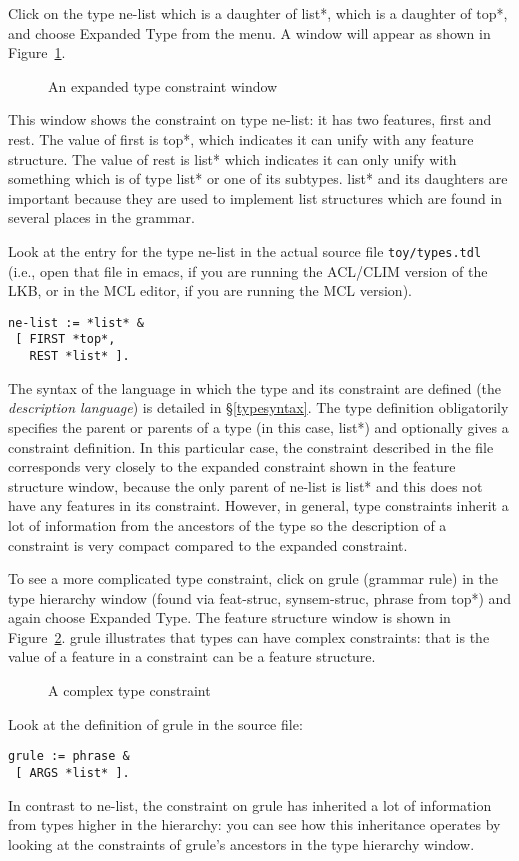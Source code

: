 \documentclass[12pt]{report}
\newcommand{\filename}[1]{{\tt #1}}
\newcommand{\lkbmenucommand}{{\bf}}
\newcommand{\newterm}[1]{{\it #1}}
\begin{document}
Click on the type {\type ne-list}
which is a daughter of {\type *list*}, which is a daughter of {\type *top*},
and choose {\lkbmenucommand Expanded Type} from the menu.  A window will appear
as shown in Figure~\ref{ne-list}.
\begin{figure}
\epsfxsize=1in
\caption{An expanded type constraint window}
\label{ne-list}
\end{figure}
This window shows the constraint on type {\type ne-list}: it has
two features, {\feature first} and {\feature rest}.  The value of
{\feature first} is {\type *top*}, which indicates it can unify with any
feature structure.  The value of {\feature rest} is {\type *list*}
which indicates it can only unify with something which is
of type {\type *list*} or one of its subtypes.  {\type *list*} and 
its daughters are important because they are used to implement
list structures which are found in several places in the grammar.

Look at the entry for the type {\type ne-list} in the actual source
file \filename{toy/types.tdl} (i.e., open that file in emacs, if you are
running the ACL/CLIM version of the LKB, or in the MCL editor, if you are
running the MCL version).
\begin{verbatim}
ne-list := *list* &
 [ FIRST *top*,
   REST *list* ].
\end{verbatim}
The syntax of the language in which the type and its constraint
are defined (the
\newterm{description language}) is detailed in \S\ref{typesyntax}.
The type definition obligatorily
specifies the parent or parents of a type (in this case,
{\type *list*}) and optionally gives a constraint definition.
In this particular case, the constraint described in the file corresponds
very closely to the expanded constraint shown in the
feature structure window, because the only parent of {\type ne-list} is
{\type *list*} and this does not have any features in its constraint.
However, in general, type constraints inherit a lot of information from
the ancestors of the type so the description of a constraint is very compact
compared to the expanded constraint.

To see a more complicated type constraint, 
click on {\type grule} (grammar rule)
in the type hierarchy 
window (found via {\type feat-struc}, 
{\type synsem-struc}, {\type phrase}
from {\type *top*})
and again choose {\lkbmenucommand Expanded Type}.
The feature structure window is shown in
Figure~\ref{grule}.  {\type grule} illustrates that types can have
complex constraints: that is the value of a feature in a constraint
can be a feature structure.  
\begin{figure}
\epsfxsize=1in
\caption{A complex type constraint}
\label{grule}
\end{figure}
Look at the definition of {\type grule} in the source file:
\begin{verbatim}
grule := phrase &
 [ ARGS *list* ].
\end{verbatim}
In contrast to {\type ne-list}, the constraint on
{\type grule} has inherited a lot of
information from types higher in the
hierarchy: you can see how this inheritance
operates by looking at the constraints of {\type grule}'s ancestors in the
type hierarchy window.
\end{document}
